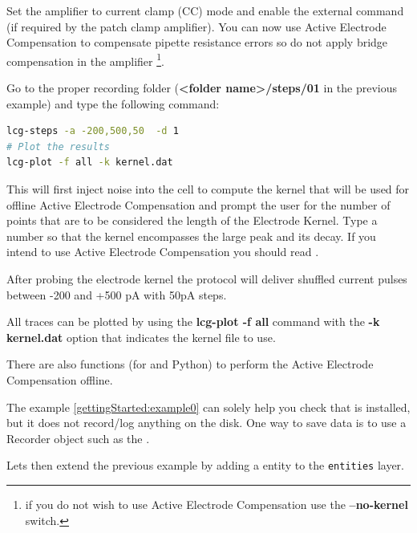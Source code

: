 Set the amplifier to current clamp (CC) mode and enable the external command (if required by the patch clamp amplifier). You can now use Active Electrode Compensation to compensate pipette resistance errors so do not apply bridge compensation in the amplifier \footnote{if you do not wish to use Active Electrode Compensation use the \textbf{--no-kernel} switch.}. 

Go to the proper recording folder (\textbf{<folder name>/steps/01} in the previous example) and type the following command:
 \begin{lstlisting}[numbers=none,language=bash]
lcg-steps -a -200,500,50  -d 1 
# Plot the results
lcg-plot -f all -k kernel.dat
\end{lstlisting}

This will first inject noise into the cell to compute the kernel that will be used for offline Active Electrode Compensation and prompt the user for the number of points that are to be considered the length of the Electrode Kernel. 
Type a number so that the kernel encompasses the large peak and its decay. If you intend to use Active Electrode Compensation you should read \cite{Brette:2008}.

After probing the electrode kernel the protocol will deliver shuffled current pulses between -200 and +500 pA with 50pA steps.

All traces can be plotted by using the \textbf{lcg-plot -f all} command with the \textbf{-k kernel.dat} option that indicates the kernel file to use.

There are also functions (for \matlab and Python) to perform the Active Electrode Compensation offline.

\iffalse

The example \ref{gettingStarted:example0} can solely help you check that \texttt{\progname} is installed, but it does not record/log anything on the disk. One way to save data is to use a Recorder object such as the .





Lets then extend the previous example by adding a  entity to the \texttt{entities} layer. 

%

